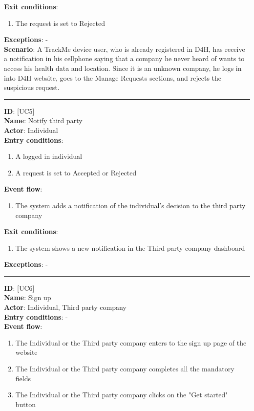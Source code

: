 \documentclass[a4paper, hidelinks, 12pt]{report}
\newcommand\usecase[1]{ [UC#1] }
\begin{document}
\begin{itemize}
\begin{enumerate}
		\end{enumerate}
		\textbf{Exit conditions}:
		\begin{enumerate}
			\item{The request is set to Rejected}
		\end{enumerate}
		\textbf{Exceptions}: - \\
		\textbf{Scenario}: A TrackMe device user, who is already registered in D4H, has receive a notification in his cellphone saying that a company he never heard of wants to access his health data and location. Since it is an unknown company, he logs in into D4H website, goes to the Manage Requests sections, and rejects the suspicious request. \\
		\rule{\linewidth}{0.4pt}
		\textbf{ID}: \usecase{5} \\
		\textbf{Name}: Notify third party \\
		\textbf{Actor}: Individual \\
		\textbf{Entry conditions}:
		\begin{enumerate}
			\item{A logged in individual}
			\item{A request is set to Accepted or Rejected}
		\end{enumerate}
		\textbf{Event flow}:
		\begin{enumerate}
			\item{The system adds a notification of the individual's decision to the third party company}
		\end{enumerate}
		\textbf{Exit conditions}:
		\begin{enumerate}
			\item{The system shows a new notification in the Third party company dashboard}
		\end{enumerate}
		\textbf{Exceptions}: - \\
		\rule{\linewidth}{0.4pt}
		\textbf{ID}: \usecase{6} \\
		\textbf{Name}: Sign up \\
		\textbf{Actor}: Individual, Third party company \\
		\textbf{Entry conditions}: - \\
		\textbf{Event flow}:
		\begin{enumerate}
			\item{The Individual or the Third party company enters to the sign up page of the website}
			\item{The Individual or the Third party company completes all the mandatory fields}
			\item{The Individual or the Third party company clicks on the "Get started" button}

\end{enumerate}
\end{itemize}
\end{document}
